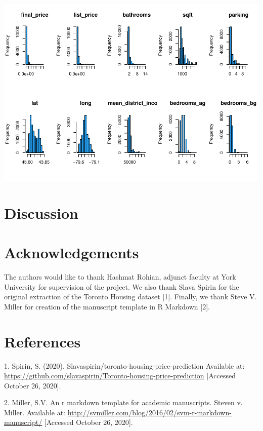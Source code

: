 \documentclass[11pt,]{article}
\begin{document}
\includegraphics{R-markdown_sean_files/figure-latex/unnamed-chunk-2-1.pdf}

\hypertarget{discussion}{%
\section{Discussion}\label{discussion}}

\hypertarget{acknowledgements}{%
\section{Acknowledgements}\label{acknowledgements}}

The authors would like to thank Hashmat Rohian, adjunct faculty at York
University for supervision of the project. We also thank Slava Spirin
for the original extraction of the Toronto Housing dataset {[}1{]}.
Finally, we thank Steve V. Miller for creation of the manuscript
template in R Markdown {[}2{]}.

\hypertarget{references}{%
\section{References}\label{references}}

\noindent

\hypertarget{refs}{}
\leavevmode\hypertarget{ref-spirin_slavaspirintoronto-housing-price-prediction_2020}{}%
1. Spirin, S. (2020). Slavaspirin/toronto-housing-price-prediction
Available at:
\url{https://github.com/slavaspirin/Toronto-housing-price-prediction}
{[}Accessed October 26, 2020{]}.

\leavevmode\hypertarget{ref-miller_r_nodate}{}%
2. Miller, S.V. An r markdown template for academic manuscripts. Steven
v. Miller. Available at:
\url{http://svmiller.com/blog/2016/02/svm-r-markdown-manuscript/}
{[}Accessed October 26, 2020{]}.





\newpage
\singlespacing 
\end{document}
